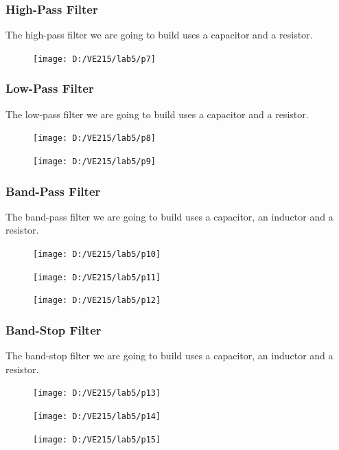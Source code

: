 \documentclass{article}
\begin{document}
\subsubsection{High-Pass Filter}
The high-pass filter we are going to build uses a capacitor and a resistor.
\begin{figure}[H]
	\centering
	\texttt{[image: D:/VE215/lab5/p7]}
	\label{fig:p7}
\end{figure}
\subsubsection{Low-Pass Filter}
The low-pass filter we are going to build uses a capacitor and a resistor.
\begin{figure}[H]
	\centering
	\texttt{[image: D:/VE215/lab5/p8]}
	\label{fig:p8}
\end{figure}
\begin{figure}[H]
	\centering
	\texttt{[image: D:/VE215/lab5/p9]}
	\label{fig:p9}
\end{figure}
\subsubsection{Band-Pass Filter}
The band-pass filter we are going to build uses a capacitor, an inductor and a resistor.
\begin{figure}[H]
	\centering
	\texttt{[image: D:/VE215/lab5/p10]}
	\label{fig:p10}
\end{figure}
\begin{figure}[H]
	\centering
	\texttt{[image: D:/VE215/lab5/p11]}
	\label{fig:p11}
\end{figure}
\begin{figure}[H]
	\centering
	\texttt{[image: D:/VE215/lab5/p12]}
	\label{fig:p12}
\end{figure}
\subsubsection{Band-Stop Filter}
The band-stop filter we are going to build uses a capacitor, an inductor and a resistor.
\begin{figure}[H]
	\centering
	\texttt{[image: D:/VE215/lab5/p13]}
	\label{fig:p13}
\end{figure}
\begin{figure}[H]
	\centering
	\texttt{[image: D:/VE215/lab5/p14]}
	\label{fig:p14}
\end{figure}
\begin{figure}[H]
	\centering
	\texttt{[image: D:/VE215/lab5/p15]}
	\label{fig:p15}
\end{figure}
\end{document}
